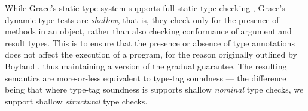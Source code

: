 While Grace's static type system supports full static type checking
\cite{graceOnward12}, Grace's dynamic type tests are \textit{shallow},
that is, they check only for the presence of methods in an object,
rather than also checking conformance of argument and result types.
This is to ensure that the presence or absence of type annotations
does not affect the execution of a program, for the reason originally
outlined by Boyland \cite{Boyland2014}, thus maintaining a version of
the gradual guarantee.
The resulting semantics are more-or-less equivalent to type-tag soundness
\cite{Greenman2018} --- the difference being that where type-tag
soundness is supports shallow \textit{nominal} type checks, we support
shallow \textit{structural} type checks.




